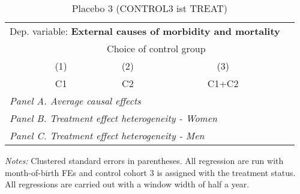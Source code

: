  \begin{table}[H] \centering \begin{threeparttable} \caption{Placebo 3 (CONTROL3 ist TREAT) } {\def\sym#1{\ifmmode^{#1}\else\(^{#1}\)\fi} \begin{tabular}{l*{4}{c}} \toprule \multicolumn{4}{l}{Dep. variable: \textbf{External causes of morbidity and mortality}} \\ & \multicolumn{3}{c}{Choice of control group} \\ \cmidrule(lr){2-4}
            &\multicolumn{1}{c}{(1)}&\multicolumn{1}{c}{(2)}&\multicolumn{1}{c}{(3)}\\
            &\multicolumn{1}{c}{C1}&\multicolumn{1}{c}{C2}&\multicolumn{1}{c}{C1+C2}\\
\midrule
 \multicolumn{4}{l}{\emph{Panel A. Average causal effects}} \\      \midrule\multicolumn{4}{l}{\emph{Panel B. Treatment effect heterogeneity - Women}} \\      \midrule\multicolumn{4}{l}{\emph{Panel C. Treatment effect heterogeneity - Men}} \\      
\bottomrule \end{tabular} } \begin{tablenotes} \item \scriptsize \emph{Notes:} Clustered standard errors in parentheses. All regression are run with month-of-birth FEs and control cohort 3 is assigned with the treatment status. All regressions are carried out with a window width of half a year. \end{tablenotes} \end{threeparttable} \end{table} 
